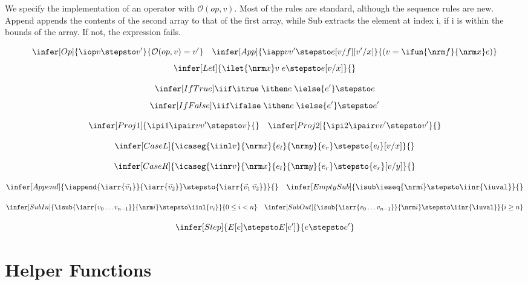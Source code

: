 We specify the implementation of an operator with
$\mathcal{O}({op},v)$. Most of the rules are standard, although the
sequence rules are new. Append appends the contents of the second
array to that of the first array, while Sub extracts the element at
index i, if i is within the bounds of the array. If not, the
expression fails.

\[
\infer[Op]{
  \iop v \stepsto v'
}{
  \mathcal{O}({op},v) = v'
}
\quad
\infer[App]{
  \iapp v {v'} \stepsto e[v/f][v'/x]
}{
  (v = \ifun {\nrm f}{\nrm x} e)
}
\]
\[%
\infer[Let]{
  \ilet {\nrm x} v \; e
  \stepsto e[v/x]
}{}
\]

\[
\infer[{IfTrue}]{
  \iif \itrue \; \ithen e \; \ielse {e'} \stepsto
  e
}{}
\]
\[%
\infer[{IfFalse}]{
  \iif \ifalse \; \ithen e \; \ielse {e'} \stepsto
  e'
}{}
\]

\[
\infer[Proj1]{
  \ipi 1 {\ipair v {v'}} \stepsto v
}{}
\quad
\infer[Proj2]{
  \ipi 2 {\ipair v {v'}} \stepsto v'
}{}
\]

\[
\infer[CaseL]{
  \icaseg{\iinl v}{\nrm x}{e_l}{\nrm y}{e_r}
  \stepsto {e_l}[v/x]
}{}
\]

\[%
\infer[CaseR]{
  \icaseg{\iinr v}{\nrm x}{e_l}{\nrm y}{e_r}
  \stepsto {e_r}[v/y]
}{}
\]

\[
\infer[Append]{
  \iappend {\iarr{\vec v_1}} {\iarr{\vec v_2}} \stepsto
  {\iarr{\vec v_1 \, \vec v_2}}
}{}
\quad
\infer[EmptySub]{
  \isub \ieseq {\nrm i} \stepsto \iinr{\iuval}
}{}
\]

\[
\infer[SubIn]{
  \isub {\iarr{v_0 \ldots v_{n-1}}} {\nrm i}
  \stepsto \iinl {v_{i}}
}{
  0 \leq i < n
}
\quad
\infer[SubOut]{
  \isub {\iarr{v_0 \ldots v_{n-1}}} {\nrm i}
  \stepsto \iinr{\iuval}
}{
  i \geq n
}
\]

\[
\infer[Step]{
  E[e] \stepsto E[e']
}{
  e \stepsto e'
}
\]

\section{Helper Functions}
\label{app:asst-functions}


